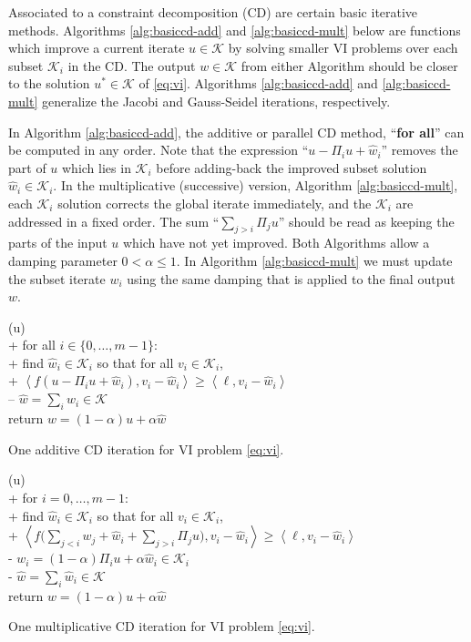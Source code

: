\documentclass[letterpaper,final,12pt,reqno]{amsart}
\theoremstyle{cstyle}
\theoremstyle{cstyle*}
\theoremstyle{dstyle}
\numberwithin{equation}{section}
\numberwithin{figure}{section}
\numberwithin{table}{section}
\numberwithin{theorem}{section}
\newcommand{\cK}{\mathcal{K}}
\newcommand{\ip}[2]{\left<#1,#2\right>}
\begin{document}
Associated to a constraint decomposition (CD) are certain basic iterative methods.  Algorithms \ref{alg:basiccd-add} and \ref{alg:basiccd-mult} below are functions which improve a current iterate $u \in \cK$ by solving smaller VI problems over each subset $\cK_i$ in the CD.   The output $w\in\cK$ from either Algorithm should be closer to the solution $u^* \in \cK$ of \eqref{eq:vi}.  Algorithms \ref{alg:basiccd-add} and \ref{alg:basiccd-mult} generalize the Jacobi and Gauss-Seidel iterations, respectively.

In Algorithm \ref{alg:basiccd-add}, the additive or parallel CD method, ``\textbf{for all}'' can be computed in any order.  Note that the expression ``$u-\Pi_iu+\hat w_i$'' removes the part of $u$ which lies in $\mathcal{K}_i$ before adding-back the improved subset solution $\hat w_i \in \mathcal{K}_i$.  In the multiplicative (successive) version, Algorithm \ref{alg:basiccd-mult}, each $\mathcal{K}_i$ solution corrects the global iterate immediately, and the $\mathcal{K}_i$ are addressed in a fixed order.  The sum ``$\sum_{j>i} \Pi_j u$'' should be read as keeping the parts of the input $u$ which have not yet improved.  Both Algorithms allow a damping parameter $0<\alpha\le 1$.  In Algorithm \ref{alg:basiccd-mult} we must update the subset iterate $w_i$ using the same damping that is applied to the final output $w$.

\begin{pseudofloat}[H]
\begin{pseudo*}
(u)\text{:} \\+
    for all $i \in \{0,\dots,m-1\}$: \\+
        \rm{find} $\hat w_i\in \cK_i$ \rm{so that for all} $v_i\in \cK_i$, \\+
            $\boxed{\ip{f(u - \Pi_i u + \hat w_i)}{v_i-\hat w_i} \ge \ip{\ell}{v_i-\hat w_i}}$ \\--
    $\hat w = \sum_i \hat w_i\in\cK$ \\
    return $w=(1-\alpha) u + \alpha \hat w$
\end{pseudo*}
\caption{One additive CD iteration for VI problem \eqref{eq:vi}.}
\label{alg:basiccd-add}
\end{pseudofloat}

\begin{pseudofloat}
\begin{pseudo*}
(u)\text{:} \\+
    for $i = 0,\dots,m-1$: \\+
        \rm{find} $\hat w_i\in \cK_i$ \rm{so that for all} $v_i\in \cK_i$, \\+
            $\displaystyle \boxed{\ip{f\Big(\sum_{j<i} w_j + \hat w_i + \sum_{j>i} \Pi_j u\Big)}{v_i-\hat w_i} \ge \ip{\ell}{v_i-\hat w_i}}$ \\-
            $w_i = (1-\alpha) \Pi_i u + \alpha \hat w_i\in\cK_i$ \\-
    $\hat w = \sum_i \hat w_i\in\cK$ \\
    return $w=(1-\alpha) u + \alpha \hat w$
\end{pseudo*}
\caption{One multiplicative CD iteration for VI problem \eqref{eq:vi}.}
\label{alg:basiccd-mult}
\end{pseudofloat}
\end{document}
